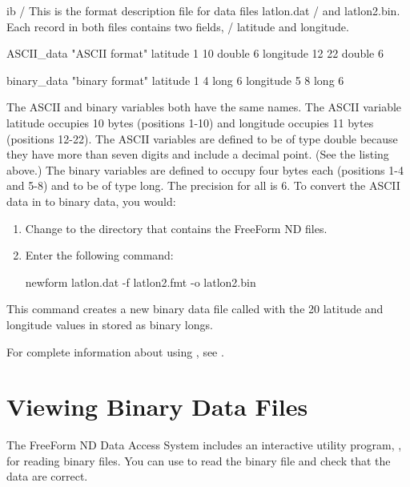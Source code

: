 \begin{vcode}{ib}
/ This is the format description file for data files latlon.dat
/ and latlon2.bin. Each record in both files contains two fields, 
/ latitude and longitude.

ASCII_data "ASCII format"
latitude 1 10 double 6
longitude 12 22 double 6

binary_data "binary format"
latitude 1 4 long 6
longitude 5 8 long 6
\end{vcode}

The ASCII and binary variables both have the same names. The ASCII
variable latitude occupies 10 bytes (positions 1-10) and longitude
occupies 11 bytes (positions 12-22). The ASCII variables are defined
to be of type double because they have more than seven digits and
include a decimal point. (See the  listing above.) The
binary variables are defined to occupy four bytes each (positions 1-4
and 5-8) and to be of type long. The precision for all is 6.  To
convert the ASCII data in  to binary data, you would:

\begin{enumerate}
\item Change to the directory that contains the FreeForm ND files. 

\item Enter the following command: 

\begin{example}
newform latlon.dat -f latlon2.fmt -o latlon2.bin 
\end{example}
\end{enumerate}

This command creates a new binary data file called 
with the 20 latitude and longitude values in  stored
as binary longs.

For complete information about using , see
. 

\section{Viewing Binary Data Files}

The FreeForm ND Data Access System includes an interactive utility
program, , for reading binary files. You can use
 to read the binary file  and check
that the data are correct.

